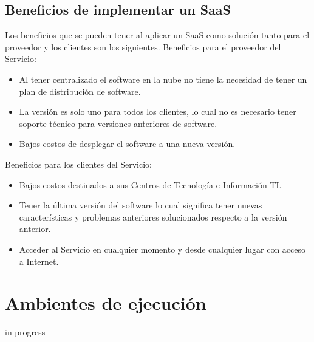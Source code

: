 \subsection{Beneficios de implementar un SaaS}
\noindent Los beneficios que se pueden tener al aplicar un SaaS como solución tanto para el proveedor y los clientes son los siguientes.
\noindent Beneficios para el proveedor del Servicio:
\begin{itemize}
\item Al tener centralizado el software en la nube no tiene la necesidad de tener un plan de distribución de software.
\item La versión es solo uno para todos los clientes, lo cual no es necesario tener soporte técnico para versiones anteriores de software.
\item Bajos costos de desplegar el software a una nueva versión.
\end{itemize}

\noindent Beneficios para los clientes del Servicio:
\begin{itemize}
\item Bajos costos destinados a sus Centros de Tecnología e Información TI.
\item Tener la última versión del software lo cual significa tener nuevas características y problemas anteriores solucionados respecto a la versión anterior.
\item Acceder al Servicio en cualquier momento y desde cualquier lugar con acceso a Internet.
\end{itemize}

\section{Ambientes de ejecución}
\noindent in progress
